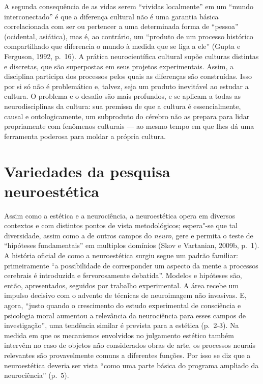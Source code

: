 A segunda consequência de as vidas serem ``vividas localmente'' em um
``mundo interconectado'' é que a diferença cultural não é uma garantia
básica correlacionada com ser ou pertencer a uma determinada forma de
``pessoa'' (ocidental, asiática), mas é, ao contrário, um ``produto de
um processo histórico compartilhado que diferencia o mundo à medida que
se liga a ele'' (Gupta e Ferguson, 1992, p.~16). A prática
neurocientífica cultural supõe culturas distintas e discretas, que são
superpostas em seus projetos experimentais. Assim, a disciplina
participa dos processos pelos quais as diferenças são construídas. Isso
por si só não é problemático e, talvez, seja um produto inevitável ao
estudar a cultura. O problema e o desafio são mais profundos, e se
aplicam a todas as neurodisciplinas da cultura: sua premissa de que a
cultura é essencialmente, causal e ontologicamente, um subproduto do
cérebro não as prepara para lidar propriamente com fenômenos culturais
--- ao mesmo tempo em que lhes dá uma ferramenta poderosa para moldar a
própria cultura.

\chapter{Variedades da pesquisa neuroestética}

Assim como a estética e a neurociência, a neuroestética opera em
diversos contextos e com distintos pontos de vista metodológicos;
espera"-se que tal diversidade, assim como a de outros campos do
\emph{neuro}, gere e permita o teste de ``hipóteses fundamentais'' em
multiplos domínios (Skov e Vartanian, 2009b, p.~1). A história oficial de
como a neuroestética surgiu segue um padrão familiar: primeiramente ``a
possibilidade de corresponder um aspecto da mente a processos cerebrais
é introduzida e fervorosamente debatida''. Modelos e hipóteses são,
então, apresentados, seguidos por trabalho experimental. A área recebe
um impulso decisivo com o advento de técnicas de neuroimagem não
invasivas. E, agora, ``justo quando o crescimento do estudo experimental
de consciência e psicologia moral aumentou a relevância da neurociência
para esses campos de investigação'', uma tendência similar é prevista
para a estética (p.~2-3). Na medida em que os mecanismos envolvidos no
julgamento estético também intervêm no caso de objetos não considerados
obras de arte, os processos neurais relevantes são provavelmente comuns
a diferentes funções. Por isso se diz que a neuroestética deveria ser
vista ``como uma parte básica do programa ampliado da neurociência''
(p.~5).

